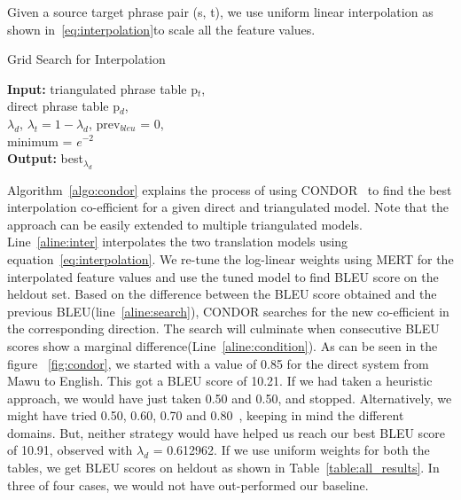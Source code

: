         Given a source target phrase pair (s, t), we use uniform linear interpolation as shown in~\eqref{eq:interpolation}to scale all the feature values. 
         \begin{algorithm}
                \small
                \caption{Grid Search for Interpolation}
                \label{algo:condor}
                \textbf{Input:} triangulated phrase table p$_{t}$, \\ direct phrase table p$_{d}$, \\
                $\lambda_{d}$, $\lambda_{t} = 1 - \lambda_{d}$, prev$_{bleu}$ = 0, \\
                minimum = $e ^{-2}$ \\
                \textbf{Output:} best$_{\lambda_{d}}$


                \begin{algorithmic}[l]
                         \label{aline:condition}
                         \label{aline:inter}
                         \label{aline:search}
                        \ENDWHILE
                       \end{algorithmic}
        \end{algorithm}

       Algorithm~\ref{algo:condor} explains the process of using CONDOR~\cite{condor-practice} to find the best interpolation co-efficient for a given direct and triangulated model. Note that the approach can be easily extended to multiple triangulated models. Line~\ref{aline:inter} interpolates the two translation models using equation~\eqref{eq:interpolation}. We re-tune the log-linear weights using MERT for the interpolated feature values and use the tuned model to find BLEU score on the heldout set. Based on the difference between the BLEU score obtained and the previous BLEU(line~\ref{aline:search}), CONDOR searches for the new co-efficient in the corresponding direction. The search will culminate when consecutive BLEU scores show a marginal difference(Line~\ref{aline:condition}). As can be seen in the figure ~\ref{fig:condor}, we started with a value of 0.85 for the direct system from Mawu to English. This got a BLEU score of 10.21. If we had taken a heuristic approach, we would have just taken 0.50 and 0.50, and stopped. Alternatively, we might have tried 0.50, 0.60, 0.70 and 0.80~\cite{Nakov:12}, keeping in mind the different domains. But, neither strategy would have helped us reach our best BLEU score of 10.91, observed with $\lambda_{d}$ = 0.612962. If we use uniform weights for both the tables, we get BLEU scores on heldout as shown in Table~\ref{table:all_results}. In three of four cases, we would not have out-performed our baseline.




